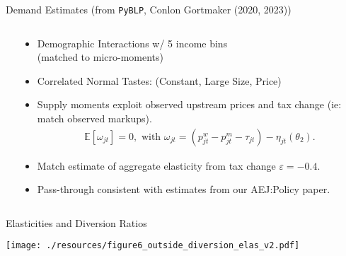 \begin{frame}{Demand Estimates (from \texttt{PyBLP}, Conlon Gortmaker (2020, 2023))}
\begin{columns}[T]
 \hspace{-1.5cm}
 \begin{column}{.68\textwidth}
\vspace{-0.3cm}
    \begin{center}
    \scalebox{0.55}{
    
    }
    \end{center}
  \end{column}
  \hfill
 \hspace{-2.2cm}
\begin{column}{.55\textwidth}
  \begin{itemize}
    \item Demographic Interactions w/ 5 income bins \\ (matched to micro-moments)
    \item Correlated Normal Tastes: (Constant, Large Size, Price)
    \item Supply moments exploit observed upstream prices and tax change (ie: match observed markups).
    \vspace{-0.2cm}
    \begin{align*}
    \mathbb{E}[\omega_{jt}]=0, \text{ with }\omega_{jt} = \left(p^w_{jt}  - p^m_{jt}-\tau_{jt} \right) -\eta_{jt}\left(\theta_2\right).
    \end{align*}
   \vspace{-0.8cm}
    \item Match estimate of aggregate elasticity from tax change $\varepsilon=-0.4$.
    \item Pass-through consistent with estimates from our AEJ:Policy paper.
  \end{itemize}
\end{column}
\end{columns}
\end{frame}

\begin{frame}{Elasticities and Diversion Ratios}
\begin{center}
    \texttt{[image: ./resources/figure6\_outside\_diversion\_elas\_v2.pdf]}
\end{center}
\end{frame}



